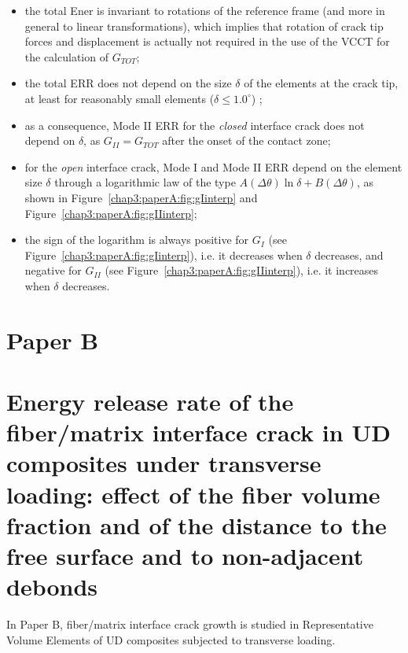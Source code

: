 \begin{itemize}
\item the total Ener is invariant to rotations of the reference frame (and more in general to linear transformations), which implies that rotation of crack tip forces and displacement is actually not required in the use of the VCCT for the calculation of $G_{TOT}$;
\item the total ERR does not depend on the size $\delta$ of the elements at the crack tip, at least for reasonably small elements ($\delta\leq1.0^{\circ}$) ;
\item as a consequence, Mode II ERR for the \emph{closed} interface crack does not depend on $\delta$, as $G_{II}=G_{TOT}$ after the onset of the contact zone;
\item for the \emph{open} interface crack, Mode I and Mode II ERR depend on the element size $\delta$ through a logarithmic law of the type $A\left(\Delta\theta\right)\ln\delta+B\left(\Delta\theta\right)$, as shown in Figure~\ref{chap3:paperA:fig:gIinterp} and Figure~\ref{chap3:paperA:fig:gIIinterp};
\item the sign of the logarithm is always positive for $G_{I}$ (see Figure~\ref{chap3:paperA:fig:gIinterp}), i.e. it decreases when $\delta$ decreases, and negative for $G_{II}$ (see Figure~\ref{chap3:paperA:fig:gIIinterp}), i.e. it increases when $\delta$ decreases.
\end{itemize}


\section{Paper B}
\section*{Energy release rate of the fiber/matrix interface crack in UD composites under transverse loading: effect of the fiber volume fraction and of the distance to the free surface and to non-adjacent debonds}

In Paper B, fiber/matrix interface crack growth is studied in Representative Volume Elements of UD composites subjected to transverse loading.

